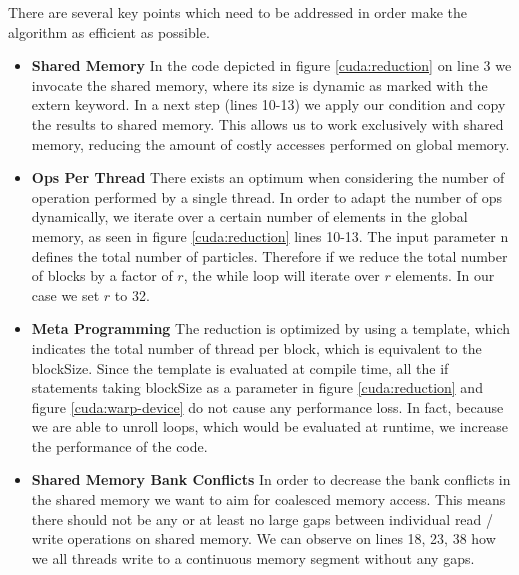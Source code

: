 \documentclass[]{article}
\begin{document}
There are several key points which need to be addressed in order make the algorithm as efficient as possible. 

\begin{itemize}
	\item \textbf{Shared Memory} 
	In the code depicted in figure \ref{cuda:reduction} on line 3 we invocate the shared memory, where its size is dynamic as marked with the extern keyword. In a next step (lines 10-13) we apply our condition and copy the results to shared memory. This allows us to work exclusively with shared memory, reducing the amount of costly accesses performed on global memory.
	
	\item \textbf{Ops Per Thread} There exists an optimum when considering the number of operation performed by a single thread. In order to adapt the number of ops dynamically, we iterate over a certain number of elements in the global memory, as seen in figure \ref{cuda:reduction} lines 10-13. The input parameter n defines the total number of particles. Therefore if we reduce the total number of blocks by a factor of $r$, the while loop will iterate over $r$ elements. In our case we set $r$ to 32. 
	
	\item \textbf{Meta Programming} The reduction is optimized by using a template, which indicates the total number of thread per block, which is equivalent to the blockSize. Since the template is evaluated at compile time, all the if statements taking blockSize as a parameter in figure \ref{cuda:reduction} and figure \ref{cuda:warp-device} do not cause any performance loss. In fact, because we are able to unroll loops, which would be evaluated at runtime, we increase the performance of the code. 

	\item \textbf{Shared Memory Bank Conflicts} In order to decrease the bank conflicts in the shared memory we want to aim for coalesced memory access. This means there should not be any or at least no large gaps between individual read / write operations on shared memory. We can observe on lines 18, 23, 38 how we all threads write to a continuous memory segment without any gaps. 
	

\end{itemize}
\end{document}
